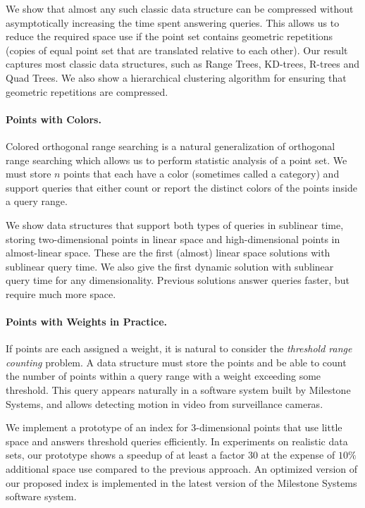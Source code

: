 We show that almost any such classic data structure can be compressed without asymptotically increasing the time spent answering queries. This allows us to reduce the required space use if the point set contains geometric repetitions (copies of equal point set that are translated relative to each other).
Our result captures most classic data structures, such as Range Trees, KD-trees, R-trees and Quad Trees. We also show a hierarchical clustering algorithm for ensuring that geometric repetitions are compressed.


\paragraph{Points with Colors.}
Colored orthogonal range searching is a natural generalization of orthogonal range searching which allows us to perform statistic analysis of a point set. We must store $n$ points that each have a color (sometimes called a category) and support queries that either count or report the distinct colors of the points inside a query range. 

We show data structures that support both types of queries in sublinear time, storing two-dimensional points in linear space and high-dimensional points in almost-linear space. These are the first (almost) linear space solutions with sublinear query time. We also give the first dynamic solution with sublinear query time for any dimensionality. Previous solutions answer queries faster, but require much more space.


\paragraph{Points with Weights in Practice.}
If points are each assigned a weight, it is natural to consider the \emph{threshold range counting} problem. A data structure must store the points and be able to count the number of points within a query range with a weight exceeding some threshold. 
This query appears naturally in a software system built by Milestone Systems, and allows detecting motion in video from surveillance cameras.

We implement a prototype of an index for 3-dimensional points that use little space and answers threshold queries efficiently. In experiments on realistic data sets, our prototype shows a speedup of at least a factor $30$ at the expense of $10\%$ additional space use compared to the previous approach. An optimized version of our proposed index is implemented in the latest version of the Milestone Systems software system.


